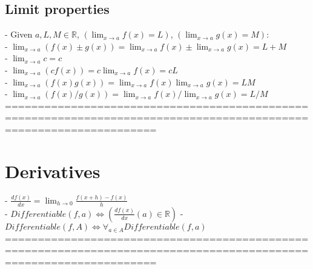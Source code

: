 \documentclass{book}
\begin{document}
\subsection{Limit properties}
	- Given $a, L, M \in \mathbb{R}$, $(\lim_{x \to a} f(x) = L)$, $(\lim_{x \to a} g(x) = M)$: \\
	- $\lim_{x \to a} (f(x) \pm g(x)) = \lim_{x \to a} f(x) \pm \lim_{x \to a} g(x) = L + M$ \\ %
	- $\lim_{x \to a} c = c$ \\ %
	- $\lim_{x \to a} (c f(x)) = c \lim_{x \to a} f(x) = c L$ \\ %
	- $\lim_{x \to a} (f(x) g(x)) = \lim_{x \to a} f(x) \lim_{x \to a} g(x) = L M$ \\ %
	- $\lim_{x \to a} (f(x) / g(x)) = \lim_{x \to a} f(x) / \lim_{x \to a} g(x) = L / M$ \\ %
	===================================================================================================================
\section{Derivatives}
	- $\frac{df(x)}{dx} = \lim_{h \rightarrow 0} \frac{f(x+h) - f(x)}{h}$ \\
	- $Differentiable(f, a) \iff (\frac{df(x)}{dx}(a) \in \mathbb{R})$
	- $Differentiable(f, A) \iff \forall_{a \in A} Differentiable(f, a)$ \\
	===================================================================================================================
\end{document}
